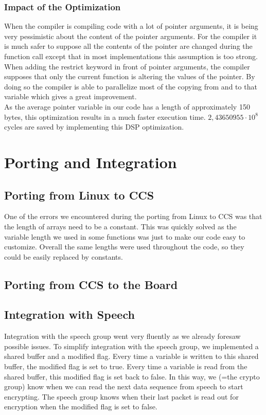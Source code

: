 \documentclass[a4paper]{article}
\begin{document}


\subsubsection{Impact of the Optimization}
When the compiler is compiling code with a lot of pointer arguments, it is being very pessimistic about the content of the pointer arguments. For the compiler it is much safer to suppose all the contents of the pointer are changed during the function call except that in most implementations this assumption is too strong. When adding the restrict keyword in front of pointer arguments, the compiler supposes that only the current function is altering the values of the pointer. By doing so the compiler is able to parallelize most of the copying from and to that variable which gives a great improvement.\\

As the average pointer variable in our code has a length of approximately 150 bytes, this optimization results in a much faster execution time. $2,43650955\cdot10^{8}$ cycles are saved by implementing this DSP optimization.

\section{Porting and Integration}

\subsection{Porting from Linux to CCS}
One of the errors we encountered during the porting from Linux to CCS was that the length of arrays need to be a constant. This was quickly solved as the variable length we used in some functions was just to make our code easy to customize. Overall the same lengths were used throughout the code, so they could be easily replaced by constants.\\

\subsection{Porting from CCS to the Board}

\subsection{Integration with Speech}
Integration with the speech group went very fluently as we already foresaw possible issues. To simplify integration with the speech group, we implemented a shared buffer and a modified flag. Every time a variable is written to this shared buffer, the modified flag is set to true. Every time a variable is read from the shared buffer, this modified flag is set back to false. In this way, we (=the crypto group) know when we can read the next data sequence from speech to start encrypting. The speech group knows when their last packet is read out for encryption when the modified flag is set to false.\\
\end{document}
